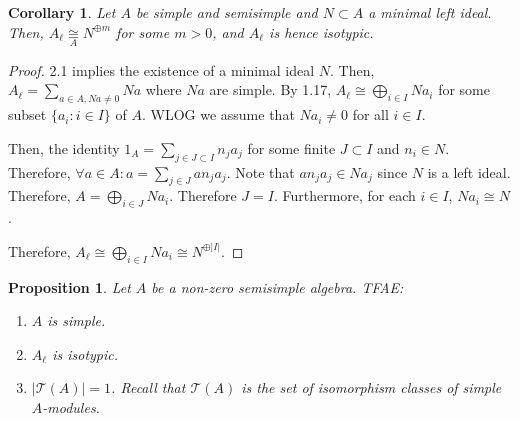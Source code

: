 \documentclass{article}
\theoremstyle{definition}
\theoremstyle{plain}
\newtheorem{proposition}[theorem]{Proposition}
\newtheorem{corollary}[theorem]{Corollary}
\theoremstyle{remark}
\begin{document}
    \begin{corollary}
        Let \(A\) be simple and semisimple and \(N \subset A\) a minimal left ideal. Then, \(A_\ell \underset{A}{\cong} N^{\oplus m}\) for some \(m > 0\), and \(A_\ell\) is hence isotypic.
    \end{corollary}

    \begin{proof}
        2.1 implies the existence of a minimal ideal \(N\). Then, \(A_\ell = \sum_{a\in A, Na\neq 0} Na\) where \(Na\) are simple. By 1.17, \(A_\ell \cong \bigoplus_{i\in I} Na_i\) for some subset \(\{ a_i : i \in I \} \) of \(A\). WLOG we assume that \(Na_i \neq 0\) for all \(i\in I\).

        Then, the identity \(1_A = \sum_{j\in J \subset I} n_j a_j\) for some finite \(J \subset I\) and \(n_i \in N\). Therefore, \(\forall a\in A: a = \sum_{j\in J} a n_j a_j\). Note that \(a n_j a_j \in Na_j\) since \(N\) is a left ideal. Therefore, \(A = \bigoplus_{i\in J} Na_i\). Therefore \(J = I\). Furthermore, for each \(i\in I\), \(Na_i \cong N\).
        
        Therefore, \(A_\ell \cong \bigoplus_{i\in I} Na_i \cong N^{\oplus \vert I \vert}\).

    \end{proof}

    \begin{proposition}
        Let \(A\) be a non-zero semisimple algebra. TFAE:

        \begin{enumerate}[label=\roman*)]
            \item \(A\) is simple.
            \item \(A_\ell\) is isotypic.
            \item \(\vert \mathcal{T} (A) \vert = 1\). Recall that \(\mathcal{T} (A)\) is the set of isomorphism classes of simple \(A\)-modules.
        \end{enumerate} 
    \end{proposition}
\end{document}
